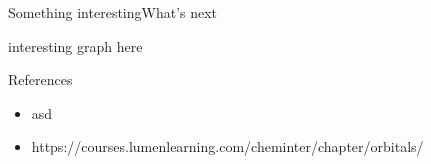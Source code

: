 \documentclass[9pt]{beamer}
\begin{document}
\begin{frame}{Something interesting}{What's next}

  interesting graph here

\end{frame}

\begin{frame}{References}
  \begin{itemize}
      \item asd
      \item https://courses.lumenlearning.com/cheminter/chapter/orbitals/
  \end{itemize}
\end{frame}
\end{document}
